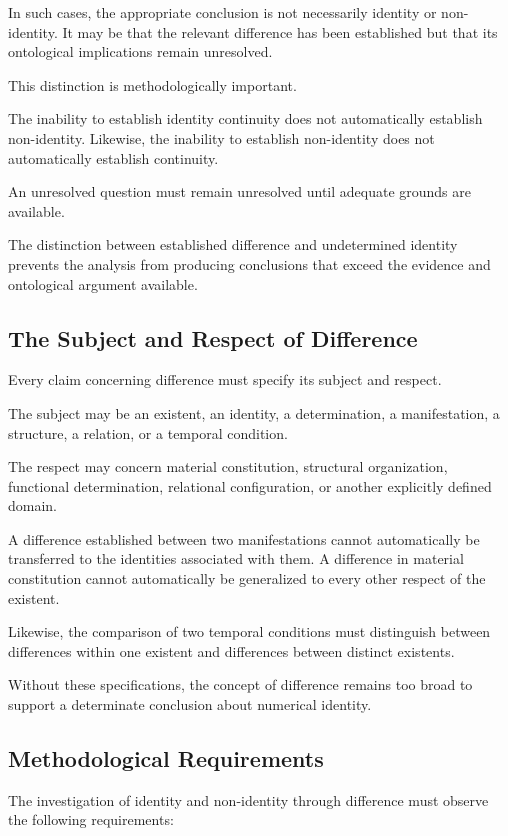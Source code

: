 In such cases, the appropriate conclusion is not
necessarily identity or non-identity. It may be
that the relevant difference has been established
but that its ontological implications remain unresolved.

This distinction is methodologically important.

The inability to establish identity continuity
does not automatically establish non-identity.
Likewise, the inability to establish non-identity
does not automatically establish continuity.

An unresolved question must remain unresolved until
adequate grounds are available.

The distinction between established difference
and undetermined identity prevents the analysis
from producing conclusions that exceed the evidence
and ontological argument available.

\subsection{The Subject and Respect of Difference}

Every claim concerning difference must specify
its subject and respect.

The subject may be an existent, an identity,
a determination, a manifestation, a structure,
a relation, or a temporal condition.

The respect may concern material constitution,
structural organization, functional determination,
relational configuration, or another explicitly
defined domain.

A difference established between two manifestations
cannot automatically be transferred to the identities
associated with them. A difference in material
constitution cannot automatically be generalized
to every other respect of the existent.

Likewise, the comparison of two temporal conditions
must distinguish between differences within one
existent and differences between distinct existents.

Without these specifications, the concept of difference
remains too broad to support a determinate conclusion
about numerical identity.

\subsection{Methodological Requirements}

The investigation of identity and non-identity through
difference must observe the following requirements:


